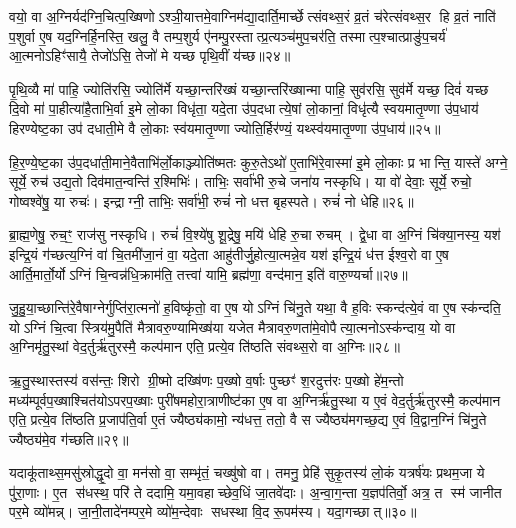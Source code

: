 वयो॒ वा अ॒ग्निर्यद॑ग्नि॒चित्प॒ख्षिणोऽश्ञी॒यात्तमे॒वाग्निम॑द्या॒दार्ति॒मार्च्छेत्संवथ्स॒रं व्र॒तं च॑रेत्संवथ्स॒र हि व्र॒तं नाति॑ प॒शुर्वा ए॒ष यद॒ग्निर्\mbox{}हि॒नस्ति॒ खलु॒ वै तम्प॒शुर्य ए॑नम्पु॒रस्तात्प्र॒त्यञ्च॑मुप॒चर॑ति॒ तस्मात्प॒श्चात्प्राङु॑प॒चर्य॑ आ॒त्मनोऽहिꣳ॑सायै॒ तेजो॑ऽसि॒ तेजो॑ मे यच्छ पृथि॒वीं य॑च्छ॥२४॥

पृ॒थि॒व्यै मा॑ पाहि॒ ज्योति॑रसि॒ ज्योति॑र्मे यच्छा॒न्तरि॑ख्षं यच्छा॒न्तरि॑ख्षान्मा पाहि॒ सुव॑रसि॒ सुव॑र्मे यच्छ॒ दिवं॑ यच्छ दि॒वो मा॑ पा॒हीत्या॑है॒ताभि॒र्वा इ॒मे लो॒का विधृ॑ता॒ यदे॒ता उ॑प॒दधात्ये॒षां लो॒कानां॒ विधृ॑त्यै स्वयमातृ॒ण्णा उ॑प॒धाय॑ हिरण्येष्ट॒का उप॑ दधाती॒मे वै लो॒काः स्व॑यमातृ॒ण्णा ज्योति॒र्\mbox{}हिर॑ण्यं॒ यथ्स्व॑यमातृ॒ण्णा उ॑प॒धाय॑॥२५॥

हि॒र॒ण्ये॒ष्ट॒का उ॑प॒दधा॑ती॒माने॒वैताभि॑र्लो॒काञ्ज्योति॑ष्मतः कुरु॒तेऽथो॑ ए॒ताभि॑रे॒वास्मा॑ इ॒मे लो॒काः प्र भान्ति॒ यास्ते॑ अग्ने॒ सूर्ये॒ रुच॑ उद्य॒तो दिव॑मात॒न्वन्ति॑ र॒श्मिभिः॑। ताभिः॒ सर्वा॑भी रु॒चे जना॑य नस्कृधि। या वो॑ देवाः॒ सूर्ये॒ रुचो॒ गोष्वश्वे॑षु॒ या रुचः॑। इन्द्राग्नी॒ ताभिः॒ सर्वा॑भी॒ रुचं॑ नो धत्त बृहस्पते। रुचं॑ नो धेहि॥२६॥

ब्रा॒ह्म॒णेषु॒ रुच॒ꣳ॒ राज॑सु नस्कृधि। रुचं॑ वि॒श्ये॑षु शू॒द्रेषु॒ मयि॑ धेहि रु॒चा रुचम्। द्वे॒धा वा अ॒ग्निं चि॑क्या॒नस्य॒ यश॑ इन्द्रि॒यं ग॑च्छत्य॒ग्निं वा॑ चि॒तमी॑जा॒नं वा॒ यदे॒ता आहु॑तीर्जु॒होत्या॒त्मन्ने॒व यश॑ इन्द्रि॒यं ध॑त्त ईश्व॒रो वा ए॒ष आर्ति॒मार्तो॒र्योऽग्निं चि॒न्वन्न॑धि॒क्राम॑ति॒ तत्त्वा॑ यामि॒ ब्रह्म॑णा॒ वन्द॑मान॒ इति॑ वारु॒ण्यर्चा॥२७॥

जु॒हु॒या॒च्छान्ति॑रे॒वैषाग्नेर्गुप्ति॑रा॒त्मनो॑ ह॒विष्कृ॑तो॒ वा ए॒ष योऽग्निं चि॑नु॒ते यथा॒ वै ह॒विः स्कन्द॑त्ये॒वं वा ए॒ष स्क॑न्दति॒ योऽग्निं चि॒त्वा स्त्रिय॑मु॒पैति॑ मैत्रावरु॒ण्यामिख्ष॑या यजेत मैत्रावरु॒णता॑मे॒वोपैत्या॒त्मनोऽस्क॑न्दाय॒ यो वा अ॒ग्निमृ॑तु॒स्थां वेद॒र्तुर्\mbox{}ऋ॑तुरस्मै॒ कल्प॑मान एति॒ प्रत्ये॒व ति॑ष्ठति संवथ्स॒रो वा अ॒ग्निः॥२८॥

ऋ॒तु॒स्थास्तस्य॑ वस॑न्तः॒ शिरो ग्री॒ष्मो दख्षि॑णः प॒ख्षो व॒र्\mbox{}षाः पुच्छꣳ॑ श॒रदुत्त॑रः प॒ख्षो हे॑म॒न्तो मध्य॑म्पूर्वप॒ख्षाश्चित॑योऽपरप॒ख्षाः पुरी॑षमहोरा॒त्राणीष्ट॑का ए॒ष वा अ॒ग्निर्\mbox{}ऋ॑तु॒स्था य ए॒वं वेद॒र्तुर्\mbox{}ऋ॑तुरस्मै॒ कल्प॑मान एति॒ प्रत्ये॒व ति॑ष्ठति प्र॒जाप॑ति॒र्वा ए॒तं ज्यैष्ठ्य॑कामो॒ न्य॑धत्त॒ ततो॒ वै स ज्यैष्ठ्य॑मगच्छ॒द्य ए॒वं वि॒द्वान॒ग्निं चि॑नु॒ते ज्यैष्ठ्य॑मे॒व ग॑च्छति॥२९॥

{\anuvakamend[{पृ॒थि॒वीं य॑च्छ॒ यथ्स्व॑यमातृ॒ण्णा उ॑प॒धाय॑ धेह्यृ॒चाग्निश्चि॑नु॒ते त्रीणि॑ च॥७॥}]}

यदाकू॑ताथ्स॒मसु॑स्रोद्धृ॒दो वा॒ मन॑सो वा॒ सम्भृ॑तं॒ चख्षु॑षो वा। तमनु॒ प्रेहि॑ सुकृ॒तस्य॑ लो॒कं यत्रर्\mbox{}ष॑यः प्रथम॒जा ये पु॑रा॒णाः। ए॒त स॑धस्थ॒ परि॑ ते ददामि॒ यमा॒वहाच्छेव॒धिं जा॒तवे॑दाः। अ॒न्वा॒ग॒न्ता य॒ज्ञप॑तिर्वो॒ अत्र॒ त स्म॑ जानीत पर॒मे व्यो॑मन्न्। जा॒नी॒तादे॑नम्पर॒मे व्यो॑म॒न्देवाः सधस्था वि॒द रू॒पम॑स्य। यदा॒गच्छात्॥३०॥

